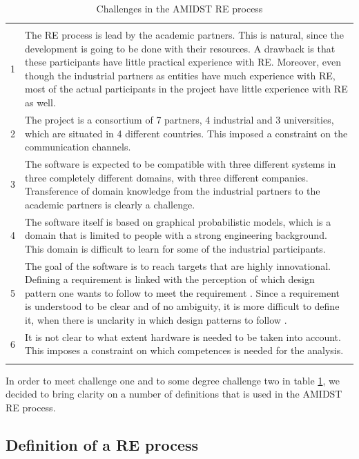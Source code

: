 \documentclass[11pt, oneside]{article}   	%
\begin{document}
\begin{table}
\caption{Challenges in the AMIDST RE process}
\vspace{1ex}
\begin{tabular}{
>{\raggedright\hspace{0pt}}m{8mm}%
>{\raggedright\hspace{0pt}}p{120mm}}
\hline
& \tabularnewline
1 & The RE process is lead by the academic partners.  This is natural, since the development is going to be done with their resources.  A drawback is that these participants have little practical experience with RE.  Moreover, even though the industrial partners as entities have much experience with RE, most of the actual participants in the project have little experience with RE as well.   \tabularnewline
2 & The project is a consortium of 7 partners, 4 industrial and 3 universities, which are situated in 4 different countries.  This imposed a constraint on the communication channels. \tabularnewline
3 & The software is expected to be compatible with three different systems in three completely different domains, with three different companies. Transference of domain knowledge from the industrial partners to the academic partners is clearly a challenge. \tabularnewline
4 & The software itself is based on graphical probabilistic models, which is a domain that is limited to people with a strong engineering background.  This domain is difficult to learn for some of the industrial participants.  \tabularnewline
5 & The goal of the software is to reach targets that are highly innovational. Defining a requirement is linked with the perception of which design pattern one wants to follow to meet the requirement \cite{Ral13}.  Since a requirement is understood to be clear and of no ambiguity, it is more difficult to define it, when there is unclarity in which design patterns to follow \cite{Ral13}. \tabularnewline
6 & It is not clear to what extent hardware is needed to be taken into account.  This imposes a constraint on which competences is needed for the analysis. \tabularnewline
& \tabularnewline
\hline
\end{tabular}
\label{tab:challenges}
\end{table}

In order to meet challenge one and to some degree challenge two in table \ref{tab:challenges}, we decided to bring clarity on a number of definitions that is used in the AMIDST RE process.

\subsection{Definition of a RE process}
\end{document}

